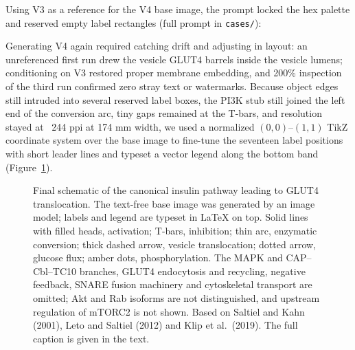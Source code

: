 Using V3 as a reference for the V4 base image, the prompt locked the hex palette and reserved empty label rectangles (full prompt in \texttt{cases/}):


Generating V4 again required catching drift and adjusting in layout: an unreferenced first run drew the vesicle GLUT4 barrels inside the vesicle lumens; conditioning on V3 restored proper membrane embedding, and 200\% inspection of the third run confirmed zero stray text or watermarks. Because object edges still intruded into several reserved label boxes, the PI3K stub still joined the left end of the conversion arc, tiny gaps remained at the T-bars, and resolution stayed at ~244 ppi at 174 mm width, we used a normalized $(0,0)$--$(1,1)$ TikZ coordinate system over the base image to fine-tune the seventeen label positions with short leader lines and typeset a vector legend along the bottom band (Figure~\ref{fig:ch07-06}).

\begin{figure}[htbp]\centering

\caption{Final schematic of the canonical insulin pathway leading to GLUT4 translocation. The text-free base image was generated by an image model; labels and legend are typeset in LaTeX on top. Solid lines with filled heads, activation; T-bars, inhibition; thin arc, enzymatic conversion; thick dashed arrow, vesicle translocation; dotted arrow, glucose flux; amber dots, phosphorylation. The MAPK and CAP--Cbl--TC10 branches, GLUT4 endocytosis and recycling, negative feedback, SNARE fusion machinery and cytoskeletal transport are omitted; Akt and Rab isoforms are not distinguished, and upstream regulation of mTORC2 is not shown. Based on Saltiel and Kahn (2001), Leto and Saltiel (2012) and Klip et al.\ (2019). The full caption is given in the text.}\label{fig:ch07-06}
\end{figure}

